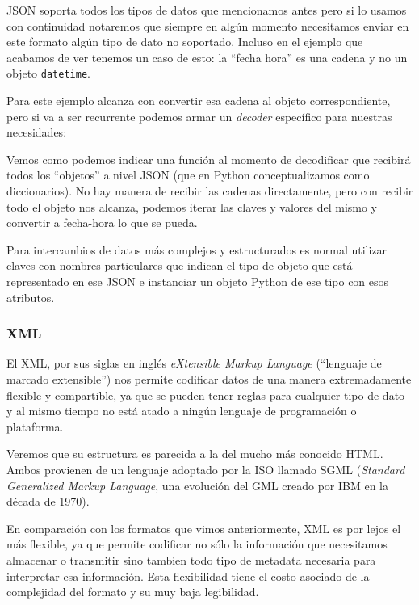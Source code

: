 JSON soporta todos los tipos de datos que mencionamos antes pero si lo usamos con continuidad notaremos que siempre en algún momento necesitamos enviar en este formato algún tipo de dato no soportado. Incluso en el ejemplo que acabamos de ver tenemos un caso de esto: la ``fecha hora'' es una cadena y no un objeto \texttt{datetime}.

Para este ejemplo alcanza con convertir esa cadena al objeto correspondiente, pero si va a ser recurrente podemos armar un \textit{decoder} específico para nuestras necesidades:


Vemos como podemos indicar una función al momento de decodificar que recibirá todos los ``objetos'' a nivel JSON (que en Python conceptualizamos como diccionarios). No hay manera de recibir las cadenas directamente, pero con recibir todo el objeto nos alcanza, podemos iterar las claves y valores del mismo y convertir a fecha-hora lo que se pueda.

Para intercambios de datos más complejos y estructurados es normal utilizar claves con nombres particulares que indican el tipo de objeto que está representado en ese JSON e instanciar un objeto Python de ese tipo con esos atributos.


\subsubsection{XML}

El XML, por sus siglas en inglés \textit{eXtensible Markup Language} (``lenguaje de marcado extensible'') nos permite codificar datos de una manera extremadamente flexible y compartible, ya que se pueden tener reglas para cualquier tipo de dato y al mismo tiempo no está atado a ningún lenguaje de programación o plataforma.

Veremos que su estructura es parecida a la del mucho más conocido HTML. Ambos provienen de un lenguaje adoptado por la ISO llamado SGML (\textit{Standard Generalized Markup Language}, una evolución del GML creado por IBM en la década de 1970).

En comparación con los formatos que vimos anteriormente, XML es por lejos el más flexible, ya que permite codificar no sólo la información que necesitamos almacenar o transmitir sino tambien todo tipo de metadata necesaria para interpretar esa información. Esta flexibilidad tiene el costo asociado de la complejidad del formato y su muy baja legibilidad.

